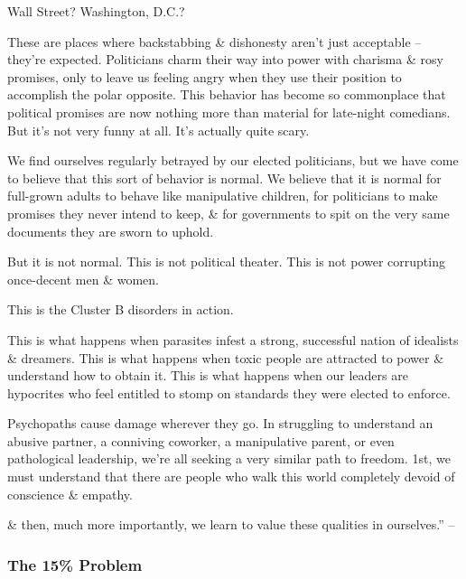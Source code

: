 \documentclass{article}
\numberwithin{equation}{section}
\begin{document}
Wall Street? Washington, D.C.?

These are places where backstabbing \& dishonesty aren't just acceptable -- they're expected. Politicians charm their way into power with charisma \& rosy promises, only to leave us feeling angry when they use their position to accomplish the polar opposite. This behavior has become so commonplace that political promises are now nothing more than material for late-night comedians. But it's not very funny at all. It's actually quite scary.

We find ourselves regularly betrayed by our elected politicians, but we have come to believe that this sort of behavior is normal. We believe that it is normal for full-grown adults to behave like manipulative children, for politicians to make promises they never intend to keep, \& for governments to spit on the very same documents they are sworn to uphold.

But it is not normal. This is not political theater. This is not power corrupting once-decent men \& women.

This is the Cluster B disorders in action.

This is what happens when parasites infest a strong, successful nation of idealists \& dreamers. This is what happens when toxic people are attracted to power \& understand how to obtain it. This is what happens when our leaders are hypocrites who feel entitled to stomp on standards they were elected to enforce.

Psychopaths cause damage wherever they go. In struggling to understand an abusive partner, a conniving coworker, a manipulative parent, or even pathological leadership, we're all seeking a very similar path to freedom. 1st, we must understand that there are people who walk this world completely devoid of conscience \& empathy.

\& then, much more importantly, we learn to value these qualities in ourselves.'' -- \cite[pp. 189--191]{MacKenzie2015}

\subsubsection{The 15\% Problem}
\end{document}

